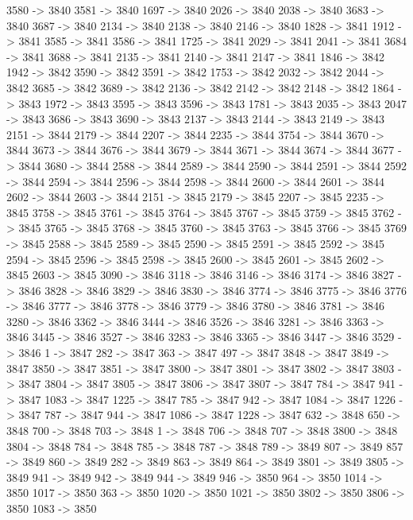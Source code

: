{	3580 -> 3840
	3581 -> 3840
	1697 -> 3840
	2026 -> 3840
	2038 -> 3840
	3683 -> 3840
	3687 -> 3840
	2134 -> 3840
	2138 -> 3840
	2146 -> 3840
	1828 -> 3841
	1912 -> 3841
	3585 -> 3841
	3586 -> 3841
	1725 -> 3841
	2029 -> 3841
	2041 -> 3841
	3684 -> 3841
	3688 -> 3841
	2135 -> 3841
	2140 -> 3841
	2147 -> 3841
	1846 -> 3842
	1942 -> 3842
	3590 -> 3842
	3591 -> 3842
	1753 -> 3842
	2032 -> 3842
	2044 -> 3842
	3685 -> 3842
	3689 -> 3842
	2136 -> 3842
	2142 -> 3842
	2148 -> 3842
	1864 -> 3843
	1972 -> 3843
	3595 -> 3843
	3596 -> 3843
	1781 -> 3843
	2035 -> 3843
	2047 -> 3843
	3686 -> 3843
	3690 -> 3843
	2137 -> 3843
	2144 -> 3843
	2149 -> 3843
	2151 -> 3844
	2179 -> 3844
	2207 -> 3844
	2235 -> 3844
	3754 -> 3844
	3670 -> 3844
	3673 -> 3844
	3676 -> 3844
	3679 -> 3844
	3671 -> 3844
	3674 -> 3844
	3677 -> 3844
	3680 -> 3844
	2588 -> 3844
	2589 -> 3844
	2590 -> 3844
	2591 -> 3844
	2592 -> 3844
	2594 -> 3844
	2596 -> 3844
	2598 -> 3844
	2600 -> 3844
	2601 -> 3844
	2602 -> 3844
	2603 -> 3844
	2151 -> 3845
	2179 -> 3845
	2207 -> 3845
	2235 -> 3845
	3758 -> 3845
	3761 -> 3845
	3764 -> 3845
	3767 -> 3845
	3759 -> 3845
	3762 -> 3845
	3765 -> 3845
	3768 -> 3845
	3760 -> 3845
	3763 -> 3845
	3766 -> 3845
	3769 -> 3845
	2588 -> 3845
	2589 -> 3845
	2590 -> 3845
	2591 -> 3845
	2592 -> 3845
	2594 -> 3845
	2596 -> 3845
	2598 -> 3845
	2600 -> 3845
	2601 -> 3845
	2602 -> 3845
	2603 -> 3845
	3090 -> 3846
	3118 -> 3846
	3146 -> 3846
	3174 -> 3846
	3827 -> 3846
	3828 -> 3846
	3829 -> 3846
	3830 -> 3846
	3774 -> 3846
	3775 -> 3846
	3776 -> 3846
	3777 -> 3846
	3778 -> 3846
	3779 -> 3846
	3780 -> 3846
	3781 -> 3846
	3280 -> 3846
	3362 -> 3846
	3444 -> 3846
	3526 -> 3846
	3281 -> 3846
	3363 -> 3846
	3445 -> 3846
	3527 -> 3846
	3283 -> 3846
	3365 -> 3846
	3447 -> 3846
	3529 -> 3846
	1 -> 3847
	282 -> 3847
	363 -> 3847
	497 -> 3847
	3848 -> 3847
	3849 -> 3847
	3850 -> 3847
	3851 -> 3847
	3800 -> 3847
	3801 -> 3847
	3802 -> 3847
	3803 -> 3847
	3804 -> 3847
	3805 -> 3847
	3806 -> 3847
	3807 -> 3847
	784 -> 3847
	941 -> 3847
	1083 -> 3847
	1225 -> 3847
	785 -> 3847
	942 -> 3847
	1084 -> 3847
	1226 -> 3847
	787 -> 3847
	944 -> 3847
	1086 -> 3847
	1228 -> 3847
	632 -> 3848
	650 -> 3848
	700 -> 3848
	703 -> 3848
	1 -> 3848
	706 -> 3848
	707 -> 3848
	3800 -> 3848
	3804 -> 3848
	784 -> 3848
	785 -> 3848
	787 -> 3848
	789 -> 3849
	807 -> 3849
	857 -> 3849
	860 -> 3849
	282 -> 3849
	863 -> 3849
	864 -> 3849
	3801 -> 3849
	3805 -> 3849
	941 -> 3849
	942 -> 3849
	944 -> 3849
	946 -> 3850
	964 -> 3850
	1014 -> 3850
	1017 -> 3850
	363 -> 3850
	1020 -> 3850
	1021 -> 3850
	3802 -> 3850
	3806 -> 3850
	1083 -> 3850
}
